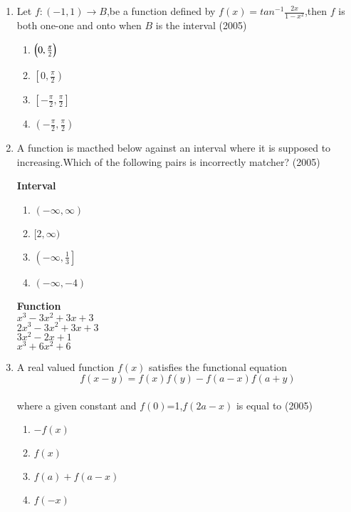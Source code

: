 \documentclass[journal,12pt,twocolumn]{IEEEtran}
\theoremstyle{remark}
\begin{document}
\begin{enumerate}[start=4]
      \item Let $f:(-1,1) \to B$,be a function defined by $f(x)=tan^{-1}\frac{2x}{1-x^{2}}$,then $f$ is both one-one and onto when $B$ is the interval \hfill(2005)
             \begin{enumerate}
		     \item $\left(0,\frac{\pi}{2}\right)$ \\
		     \item $\left[0,\frac{\pi}{2}\right)$ \\
		     \item $\left[-\frac{\pi}{2},\frac{\pi}{2}\right]$ \\
		     \item $\left(-\frac{\pi}{2},\frac{\pi}{2}\right)$
	     \end{enumerate}
     \item A function is macthed below against an interval where it is supposed to increasing.Which of the following pairs is incorrectly matcher? \hfill(2005)
	     \begin{multicols}{2}
		     \textbf{Interval}
                     \begin{enumerate}
                        \item $(-\infty,\infty)$
                        \item $[2,\infty)$
                        \item $\left(-\infty,\frac{1}{3}\right]$
                        \item $(-\infty,-4)$
                     \end{enumerate}

                  \columnbreak

                    \textbf{Function}\\
                      $x^{3} - 3x^{2} + 3x + 3$\\
                      $2x^{3} - 3x^{2} + 3x + 3$\\
                      $3x^{2} - 2x + 1$\\
                      $x^{3} + 6x^{2} + 6$\\
	     \end{multicols}

     \item A real valued function $f(x)$ satisfies the functional equation $$f(x-y)=f(x)f(y)-f(a-x)f(a+y)$$\\
	     where a given constant and $f(0)$=1,$f(2a-x)$ is equal to \hfill(2005)
	     \begin{enumerate}
		     \item $-f(x)$
		     \item $f(x)$
		     \item $f(a)+f(a-x)$
		     \item $f(-x)$
	     \end{enumerate}


\end{enumerate}
\end{document}
